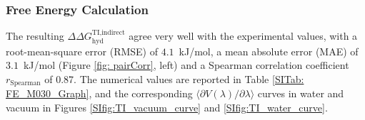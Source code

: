 \subsubsection{Free Energy Calculation}
The resulting $\Delta \Delta G_\text{hyd}^\text{TI,indirect}$ agree very well with the experimental values,\cite{Wolfenden1987,Rizzo2006,Nicholls2008,Guthrie2009,Guthrie2014,Mobley2014} with a root-mean-square error (RMSE) of $4.1$~kJ/mol, a mean absolute error (MAE) of $3.1$~kJ/mol (Figure \ref{fig: pairCorr}, left) and a Spearman correlation coefficient $r_{\text{Spearman}}$ of 0.87.
The numerical values are reported in Table \ref{SITab: FE_M030_Graph},
and the corresponding $\langle \partial V(\lambda)/\partial\lambda \rangle$ curves in water and vacuum in Figures \ref{SIfig:TI_vacuum_curve} and  \ref{SIfig:TI_water_curve}. 

